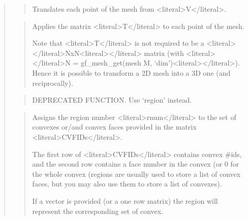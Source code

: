 \documentclass[a4paper,11pt,english]{sphinxmanual}
\begin{document}
\begin{quote}
\begin{quote}
\sphinxAtStartPar
Translates each point of the mesh from \textless{}literal\textgreater{}V\textless{}/literal\textgreater{}.
\end{quote}

\sphinxAtStartPar
{}
\begin{quote}

\sphinxAtStartPar
Applies the matrix \textless{}literal\textgreater{}T\textless{}/literal\textgreater{} to each point of the mesh.

\sphinxAtStartPar
Note that \textless{}literal\textgreater{}T\textless{}/literal\textgreater{} is not required to be a \textless{}literal\textgreater{}\textless{}/literal\textgreater{}NxN\textless{}literal\textgreater{}\textless{}/literal\textgreater{} matrix (with
\textless{}literal\textgreater{}\textless{}/literal\textgreater{}N = gf\_mesh\_get(mesh M, ‘dim’)\textless{}literal\textgreater{}\textless{}/literal\textgreater{}). Hence it is possible to transform
a 2D mesh into a 3D one (and reciprocally).
\end{quote}

\sphinxAtStartPar
{}
\begin{quote}

\sphinxAtStartPar
DEPRECATED FUNCTION. Use ‘region’ instead.
\end{quote}

\sphinxAtStartPar
{}
\begin{quote}

\sphinxAtStartPar
Assigns the region number \textless{}literal\textgreater{}rnum\textless{}/literal\textgreater{} to the set of convexes or/and convex
faces provided in the matrix \textless{}literal\textgreater{}CVFIDs\textless{}/literal\textgreater{}.

\sphinxAtStartPar
The first row of \textless{}literal\textgreater{}CVFIDs\textless{}/literal\textgreater{} contains convex \#ids, and the second row
contains a face number in the convex (or 0
for the whole convex (regions are usually used to store a list of
convex faces, but you may also use them to store a list of convexes).

\sphinxAtStartPar
If a vector is provided (or a one row matrix) the region will represent
the corresponding set of convex.
\end{quote}


\end{quote}
\end{document}
